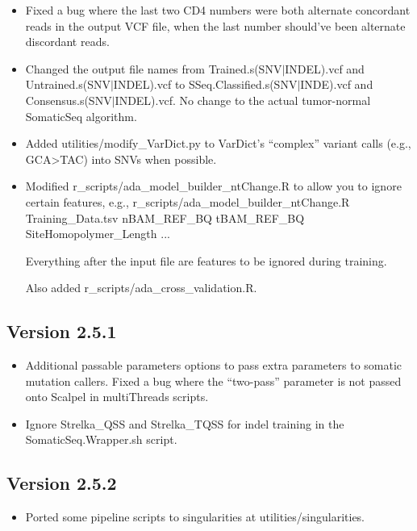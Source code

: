 \documentclass[10pt,letterpaper]{article}
\begin{document}
\begin{sloppypar}
\begin{itemize}
  \item
  Fixed a bug where the last two CD4 numbers were both alternate concordant reads in the output VCF file, when the last number should've been alternate discordant reads.
  
  \item
  Changed the output file names from Trained.s(SNV$\vert$INDEL).vcf and Untrained.s(SNV$\vert$INDEL).vcf to SSeq.Classified.s(SNV$\vert$INDE).vcf and Consensus.s(SNV$\vert$INDEL).vcf. No change to the actual tumor-normal SomaticSeq algorithm.
  
  \item
  Added utilities/modify\_VarDict.py to VarDict's ``complex'' variant calls (e.g., GCA>TAC) into SNVs when possible. 
  
  \item
  Modified r\_scripts/ada\_model\_builder\_ntChange.R to allow you to ignore certain features, e.g., r\_scripts/ada\_model\_builder\_ntChange.R Training\_Data.tsv nBAM\_REF\_BQ tBAM\_REF\_BQ SiteHomopolymer\_Length ...
  
  Everything after the input file are features to be ignored during training.
  
  Also added r\_scripts/ada\_cross\_validation.R.

\end{itemize}



\subsection{Version 2.5.1}

\begin{itemize}
  \item
  Additional passable parameters options to pass extra parameters to somatic mutation callers. Fixed a bug where the ``two-pass'' parameter is not passed onto Scalpel in multiThreads scripts. 
  
  \item
  Ignore Strelka\_QSS and Strelka\_TQSS for indel training in the SomaticSeq.Wrapper.sh script.
  
\end{itemize}



\subsection{Version 2.5.2}

\begin{itemize}
  \item
  Ported some pipeline scripts to singularities at utilities/singularities.
  

\end{itemize}
\end{sloppypar}
\end{document}

